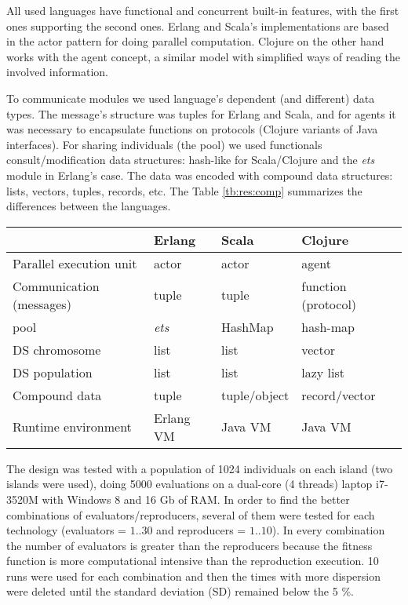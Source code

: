 
All used languages have functional and concurrent built-in features, with the first ones supporting the second ones. Erlang and Scala’s implementations are based in the actor pattern for doing parallel computation. Clojure on the other hand works with the agent concept, a similar model with simplified ways of reading the involved information.

To communicate modules we used language’s dependent (and different) data types.
The message's structure was tuples for Erlang and Scala, and for agents it was necessary to encapsulate functions on protocols (Clojure variants of Java interfaces). For sharing individuals (the pool) we used functionals consult/modification data structures: hash-like for Scala/Clojure and the {\em ets} module in Erlang’s case. The data was encoded with compound data structures: lists, vectors, tuples, records, etc. The Table \ref{tb:res:comp} summarizes the differences between the languages.

\begin{table*}
  \caption{Language concept used for each pGA component.}\label{tb:res:comp}
  \centering
  \begin{tabular}{|p{4cm}|>{\centering}p{2.4cm}|>{\centering}p{2.4cm}|>{\centering}p{3cm}|}    \hline
     & \textbf{Erlang} & \textbf{Scala} & \textbf{Clojure} \tabularnewline
    \hline
    Parallel execution unit & actor & actor & agent \tabularnewline
    \hline
    Communication (messages) & tuple & tuple & function (protocol) \tabularnewline
    \hline
    pool & \emph{ets} & HashMap & hash-map \tabularnewline
    \hline
    DS chromosome & list & list & vector \tabularnewline
    \hline
    DS population & list & list & lazy list \tabularnewline
    \hline
    Compound data & tuple & tuple/object & record/vector \tabularnewline
    \hline
    Runtime environment & Erlang VM & Java VM & Java VM \tabularnewline
    \hline
  \end{tabular}

\end{table*}



The design was tested with a population of 1024 individuals on each island (two islands were used), doing 5000 evaluations on a dual-core (4 threads) laptop  i7-3520M with Windows 8 and 16 Gb of RAM. In order to find the better combinations of evaluators/reproducers, several of them were tested for each technology (evaluators = $1..30$ and reproducers = $1..10$). In every combination the number of evaluators is greater than the reproducers because the fitness function is more computational intensive than the reproduction execution. 10 runs were used for each combination and then the times with more dispersion were deleted until the standard deviation (SD) remained below the 5 \%.

